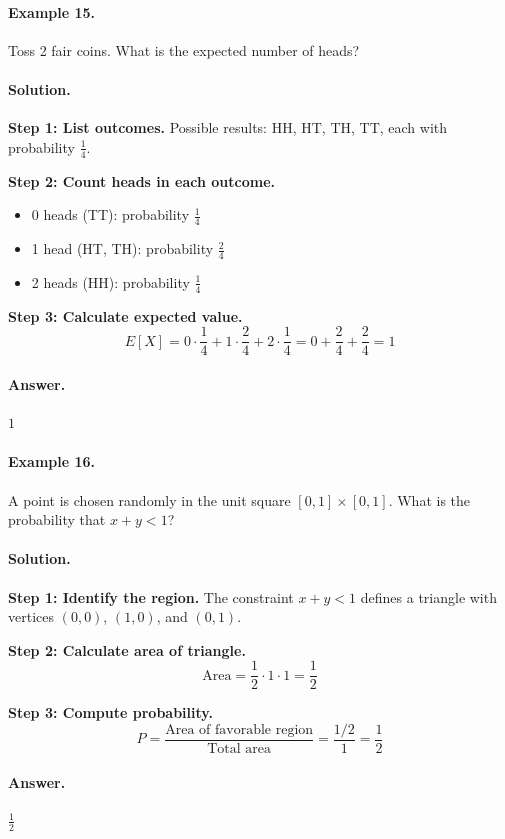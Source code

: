 \documentclass[12pt]{extarticle}
\begin{document}
\paragraph{Example 15.} Toss 2 fair coins. What is the expected number of heads?

\paragraph{Solution.}
\textbf{Step 1: List outcomes.} Possible results: HH, HT, TH, TT, each with probability $\frac{1}{4}$.

\textbf{Step 2: Count heads in each outcome.}
\begin{itemize}
    \item 0 heads (TT): probability $\frac{1}{4}$
    \item 1 head (HT, TH): probability $\frac{2}{4}$
    \item 2 heads (HH): probability $\frac{1}{4}$
\end{itemize}

\textbf{Step 3: Calculate expected value.}
\[
E[X] = 0 \cdot \frac{1}{4} + 1 \cdot \frac{2}{4} + 2 \cdot \frac{1}{4} = 0 + \frac{2}{4} + \frac{2}{4} = 1
\]

\paragraph{Answer.} $\boxed{1}$

\paragraph{Example 16.} A point is chosen randomly in the unit square $[0,1]\times[0,1]$. What is the probability that $x+y<1$?

\paragraph{Solution.}
\textbf{Step 1: Identify the region.} The constraint $x+y<1$ defines a triangle with vertices $(0,0)$, $(1,0)$, and $(0,1)$.

\textbf{Step 2: Calculate area of triangle.}
\[
\text{Area} = \frac{1}{2} \cdot 1 \cdot 1 = \frac{1}{2}
\]

\textbf{Step 3: Compute probability.} 
\[
P = \frac{\text{Area of favorable region}}{\text{Total area}} = \frac{1/2}{1} = \frac{1}{2}
\]

\paragraph{Answer.} $\boxed{\frac{1}{2}}$
\end{document}
